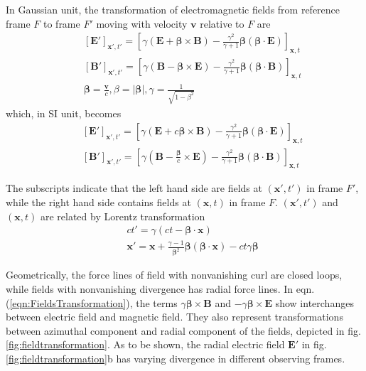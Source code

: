\documentclass[prd,showpacs,twocolumn]{revtex4-1}
\begin{document}
In Gaussian unit, the transformation of electromagnetic fields from reference frame $F$ to frame $F'$ moving with velocity $\mathbf{v}$ relative to $F$ are\cite{Jackson}
\begin{eqnarray}
&&[\mathbf{E'}]_{\mathbf{x'},t'}=[\gamma(\mathbf{E}+\boldsymbol\beta\times\mathbf{B})-\frac{\gamma^2}{\gamma+1}\boldsymbol\beta(\boldsymbol\beta\cdot\mathbf{E})]_{\mathbf{x},t}\nonumber\\
&&[\mathbf{B'}]_{\mathbf{x'},t'}=[\gamma(\mathbf{B}-\boldsymbol\beta\times\mathbf{E})-\frac{\gamma^2}{\gamma+1}\boldsymbol\beta(\boldsymbol\beta\cdot\mathbf{B})]_{\mathbf{x},t}\nonumber\\
&&\boldsymbol\beta=\frac{\mathbf{v}}{c},\beta=|\boldsymbol\beta|,\gamma=\frac{1}{\sqrt{1-\beta^2}}
\label{eqn:FieldsTransformation}
\end{eqnarray}
which, in SI unit, becomes
\begin{eqnarray}
&&[\mathbf{E'}]_{\mathbf{x'},t'}=[\gamma(\mathbf{E}+c\boldsymbol\beta\times\mathbf{B})-\frac{\gamma^2}{\gamma+1}\boldsymbol\beta(\boldsymbol\beta\cdot\mathbf{E})]_{\mathbf{x},t}\nonumber\\
&&[\mathbf{B'}]_{\mathbf{x'},t'}=[\gamma(\mathbf{B}-\frac{\boldsymbol\beta}{c}\times\mathbf{E})-\frac{\gamma^2}{\gamma+1}\boldsymbol\beta(\boldsymbol\beta\cdot\mathbf{B})]_{\mathbf{x},t}
\label{eqn:SIFieldsTransformation}
\end{eqnarray}

The subscripts indicate that the left hand side are fields at $(\mathbf{x'},t')$ in frame $F'$, while the right hand side contains fields at $(\mathbf{x},t)$ in frame $F$. $(\mathbf{x'},t')$ and $(\mathbf{x},t)$ are related by Lorentz transformation
\begin{eqnarray}
&&ct'=\gamma(ct-\boldsymbol\beta\cdot\mathbf{x})\nonumber\\
&&\mathbf{x'}=\mathbf{x}+\frac{\gamma-1}{\boldsymbol\beta^2}\boldsymbol\beta(\boldsymbol\beta\cdot\mathbf{x})-ct\gamma\boldsymbol\beta
\label{eqn:LorentzTranformation}
\end{eqnarray}

Geometrically, the force lines of field with nonvanishing curl are closed loops, while fields with nonvanishing divergence has radial force lines. In eqn. (\ref{eqn:FieldsTransformation}), the terms $\gamma\boldsymbol\beta\times\mathbf{B}$ and $-\gamma\boldsymbol\beta\times\mathbf{E}$ show interchanges between electric field and magnetic field. They also represent transformations between azimuthal component and radial component of the fields, depicted in fig. \ref{fig:fieldtransformation}. As to be shown, the radial electric field $\mathbf{E}'$ in fig. \ref{fig:fieldtransformation}b has varying divergence in different observing frames.
\end{document}
